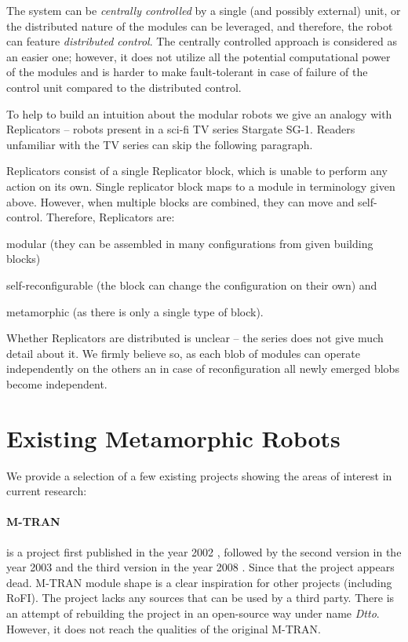 The system can be \emph{centrally controlled} by a single (and possibly
external) unit, or the distributed nature of the modules can be leveraged, and
therefore, the robot can feature \emph{distributed control}. The centrally
controlled approach is considered as an easier one; however, it does not utilize
all the potential computational power of the modules and is harder to make
fault-tolerant in case of failure of the control unit compared to the
distributed control.

To help to build an intuition about the modular robots we give an analogy with
Replicators -- robots present in a sci-fi TV series Stargate
SG-1\cite{wright_stargate_1997}. Readers unfamiliar with the TV series can skip
the following paragraph.

Replicators consist of a single Replicator block, which is unable to perform any
action on its own. Single replicator block maps to a module in terminology given
above. However, when multiple blocks are combined, they can move and
self-control. Therefore, Replicators are:
\begin{enumerate*}
    \item modular (they can be assembled in many configurations from given
    building blocks)
    \item self-reconfigurable (the block can change the configuration on their
    own) and
    \item metamorphic (as there is only a single type of block).
\end{enumerate*}
Whether Replicators are distributed is unclear -- the series does not give much
detail about it. We firmly believe so, as each blob of modules can operate
independently on the others an in case of reconfiguration all newly emerged
blobs become independent.

\section{Existing Metamorphic Robots}

We provide a selection of a few existing projects showing the areas of interest
in current research:

\paragraph{M-TRAN} is a project first published in the year 2002
\cite{murata_m-tran:_2002}, followed by the second version in the year 2003
\cite{haruhisa_kurokawa_m-tran_2003} and the third version in the year 2008
\cite{kurokawa_distributed_2008}. Since that the project appears dead. M-TRAN
module shape is a clear inspiration for other projects (including RoFI). The
project lacks any sources that can be used by a third party. There is an
attempt of rebuilding the project in an open-source way under name
\emph{Dtto}\cite{noauthor_dtto_nodate}. However, it does not reach the qualities
of the original M-TRAN.

